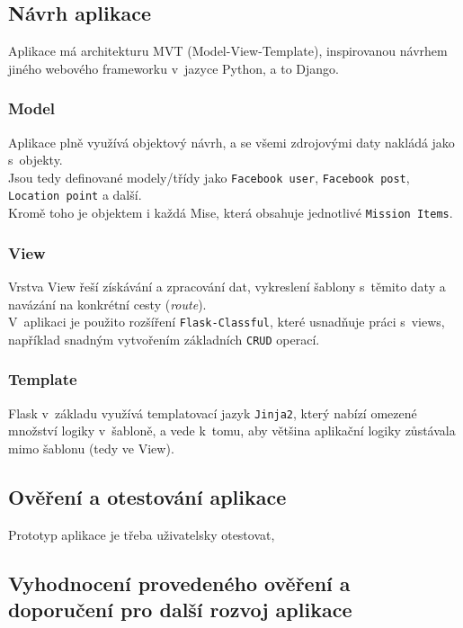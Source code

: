 \subsection{Návrh aplikace}
Aplikace má architekturu MVT (Model-View-Template), inspirovanou návrhem jiného webového frameworku v~jazyce Python, a to Django.

\subsubsection*{Model}
Aplikace plně využívá objektový návrh, a se všemi zdrojovými daty nakládá jako s~objekty.\\
Jsou tedy definované modely/třídy jako \verb|Facebook user|, \verb|Facebook post|, \verb|Location point| a další.\\
Kromě toho je objektem i každá Mise, která obsahuje jednotlivé \verb|Mission Items|.

\subsubsection*{View}
Vrstva View řeší získávání a zpracování dat, vykreslení šablony s~těmito daty a navázání na konkrétní cesty (\textit{route}).\\
V~aplikaci je použito rozšíření \verb|Flask-Classful|, které usnadňuje práci s~views, například snadným vytvořením základních \verb|CRUD| operací.

\subsubsection*{Template}
Flask v~základu využívá templatovací jazyk \verb|Jinja2|, který nabízí omezené množství logiky v~šabloně, a vede k~tomu, aby většina aplikační logiky zůstávala mimo šablonu (tedy ve View).

\subsection{Ověření a otestování aplikace}
Prototyp aplikace je třeba uživatelsky otestovat, 


\subsection{Vyhodnocení provedeného ověření a doporučení pro další rozvoj aplikace}